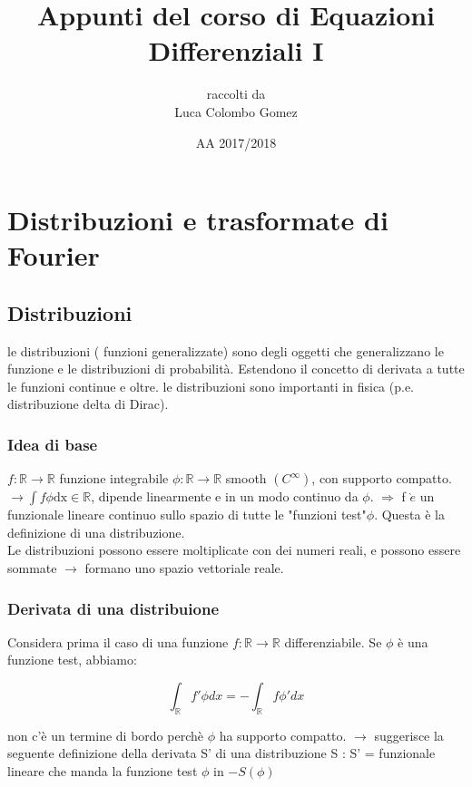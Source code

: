 \documentclass[a4paper,11pt]{report}
\title{Appunti del corso di Equazioni Differenziali I}
\author{raccolti da \\Luca Colombo Gomez}
\date{AA 2017/2018}
\newcommand{\R}{\mathbb{R}}
\begin{document}
\titlepage
\maketitle

\tableofcontents
\chapter{Distribuzioni e trasformate di Fourier}
\section{Distribuzioni}
le distribuzioni ( funzioni generalizzate) sono degli oggetti che generalizzano le funzione e le distribuzioni di probabilità. 
Estendono il concetto di derivata a tutte le funzioni continue e oltre.
le distribuzioni sono importanti in fisica (p.e. distribuzione delta di Dirac).

\subsection{Idea di base}
$f:\R\rightarrow\R $ funzione integrabile
$ \phi : \R \rightarrow \R $ smooth $\left(C^{\infty}\right)$, con supporto compatto.
$\rightarrow \int f \phi \mathrm{dx} \in \mathbb{R}$, dipende linearmente e in un modo continuo da $\phi$.
$\Rightarrow$ f $\grave{e}$ un funzionale lineare continuo sullo spazio di tutte le "funzioni test"$\phi.$ Questa è la definizione di una distribuzione.\\
Le distribuzioni possono essere moltiplicate con dei numeri reali, e possono essere sommate $\rightarrow$ formano uno spazio vettoriale reale.
\subsection{Derivata di una distribuione}
Considera prima il caso di una funzione $f:\R \rightarrow \R$ differenziabile. Se $\phi$ è una funzione test, abbiamo:

$$\int_{\R}f'\phi dx = -\int_{\R}f\phi ' dx$$

non c'è un termine di bordo perchè $\phi $ ha supporto compatto. $\rightarrow $ suggerisce la seguente definizione della derivata S' di una distribuzione 
S : S' = funzionale lineare che manda la funzione test $\phi$ in $-S\left(\phi\right)$
\end{document}

